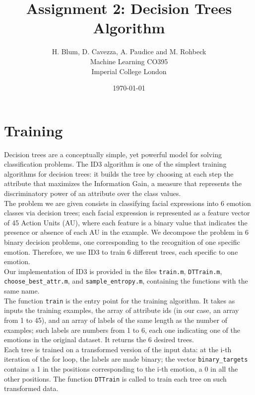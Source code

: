\documentclass{article}
\begin{document}
\author{H. Blum, D. Cavezza, A. Paudice and M. Rohbeck\\
 Machine Learning CO395\\
  Imperial College London}
\date{\today}
\title{Assignment 2: Decision Trees Algorithm}
\maketitle

\section{Training}
Decision trees are a conceptually simple, yet powerful model for solving classification problems. The ID3 algorithm is one of the simplest training algorithms for decision trees: it builds the tree by choosing at each step the attribute that maximizes the Information Gain, a measure that represents the discriminatory power of an attribute over the class values.\\
The problem we are given consists in classifying facial expressions into 6 emotion classes via decision trees; each facial expression is represented as a feature vector of 45 Action Units (AU), where each feature is a binary value that indicates the presence or absence of each AU in the example. We decompose the problem in 6 binary decision problems, one corresponding to the recognition of one specific emotion. Therefore, we use ID3 to train 6 different trees, each specific to one emotion.\\
Our implementation of ID3 is provided in the files \verb$train.m$, \verb$DTTrain.m$, \verb$choose_best_attr.m$, and \verb$sample_entropy.m$, containing the functions with the same name.\\
The function \verb$train$ is the entry point for the training algorithm. It takes as inputs the training examples, the array of attribute ids (in our case, an array from 1 to 45), and an array of labels of the same length as the number of examples; such labels are numbers from 1 to 6, each one indicating one of the emotions in the original dataset. It returns the 6 desired trees.\\
Each tree is trained on a transformed version of the input data: at the i-th iteration of the for loop, the labels are made binary; the vector \verb$binary_targets$ contains a 1 in the positions corresponding to the i-th emotion, a 0 in all the other positions. The function \verb$DTTrain$ is called to train each tree on such transformed data.
\end{document}
